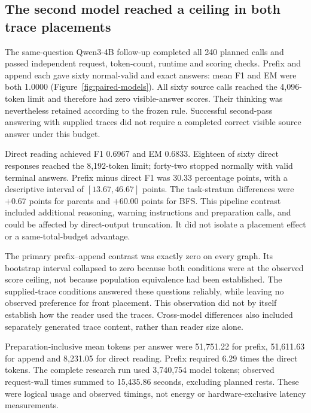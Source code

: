 


\subsection{The second model reached a ceiling in both trace placements}
\label{sec:paired-models}
The same-question Qwen3-4B follow-up completed all 240 planned calls and passed independent request, token-count, runtime and scoring checks. Prefix and append each gave sixty normal-valid and exact answers: mean F1 and EM were both 1.0000 (Figure~\ref{fig:paired-models}). All sixty source calls reached the 4,096-token limit and therefore had zero visible-answer scores. Their thinking was nevertheless retained according to the frozen rule. Successful second-pass answering with supplied traces did not require a completed correct visible source answer under this budget.

Direct reading achieved F1 0.6967 and EM 0.6833. Eighteen of sixty direct responses reached the 8,192-token limit; forty-two stopped normally with valid terminal answers. Prefix minus direct F1 was 30.33 percentage points, with a descriptive interval of $[13.67,46.67]$ points. The task-stratum differences were $+0.67$ points for parents and $+60.00$ points for BFS. This pipeline contrast included additional reasoning, warning instructions and preparation calls, and could be affected by direct-output truncation. It did not isolate a placement effect or a same-total-budget advantage.

The primary prefix--append contrast was exactly zero on every graph. Its bootstrap interval collapsed to zero because both conditions were at the observed score ceiling, not because population equivalence had been established. The supplied-trace conditions answered these questions reliably, while leaving no observed preference for front placement. This observation did not by itself establish how the reader used the traces. Cross-model differences also included separately generated trace content, rather than reader size alone.

Preparation-inclusive mean tokens per answer were 51,751.22 for prefix, 51,611.63 for append and 8,231.05 for direct reading. Prefix required $6.29$ times the direct tokens. The complete research run used 3,740,754 model tokens; observed request-wall times summed to 15,435.86 seconds, excluding planned rests. These were logical usage and observed timings, not energy or hardware-exclusive latency measurements.

